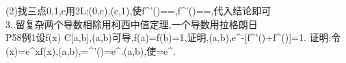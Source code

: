 \documentclass[a4paper,fleqn]{article}
\begin{document}
(2)找三点0,1,c用2L;\exists\xi\in(0,c),\eta\in(c,1),使f^'(\xi)==,f^'(\eta)==,代入结论即可\\
3.\xi{}.留复杂\qquad 两个导数相除用柯西中值定理,一个导数用拉格朗日\\
P58例1设f(x) \in C[a,b],(a,b)可导,f(a)=f(b)=1,证明\exists\xi,\eta\in(a,b),e^{\eta-\xi}[f^'(\eta)+f^(\eta)]=1.
证明:令\varphi(x)=e^xf(x),\exists\in(a,b),=\varphi^'(\eta)\Rightarrow \quad {}=e^.\exists\xi\in(a,b),使=e^{\xi}.\\


\)
\end{document}
